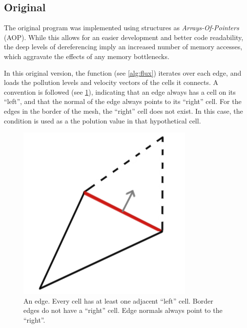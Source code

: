 \subsection{Original}
\label{sec:310}


The original \polu program was implemented using structures as \textit{Arrays-Of-Pointers} (AOP). While this allows for an easier development and better code readability, the deep levels of dereferencing imply an increased number of memory accesses, which aggravate the effects of any memory bottlenecks.

In this original version, the \computeflux function (see \cref{alg:flux}) iterates over each edge, and loads the pollution levels and velocity vectors of the cells it connects.
A convention is followed (see \cref{fig:edge}), indicating that an edge always has a cell on its ``left'', and that the normal of the edge always points to its ``right'' cell. For the edges in the border of the mesh, the ``right'' cell does not exist. In this case, the \dirichlet condition is used as a the polution value in that hypothetical cell.

\begin{figure}
	\centering
	\includegraphics[width=.5\columnwidth]{images/edge-normal.png}
	\caption[An edge]{An edge. Every cell has at least one adjacent ``left'' cell. Border edges do not have a ``right'' cell. Edge normals always point to the ``right''.}
	\label{fig:edge}
\end{figure}

